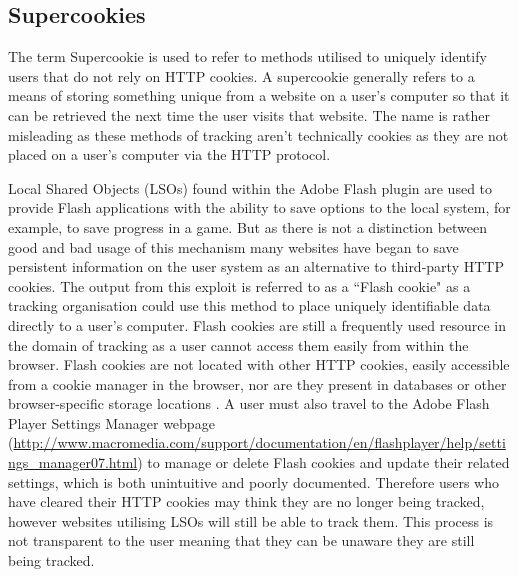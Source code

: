 \documentclass[12pt]{article}
\begin{document}
\subsection{Supercookies} \label{Supercookies}
The term Supercookie is used to refer to methods utilised to uniquely identify users that do not rely on HTTP cookies. A supercookie generally refers to a means of storing something unique from a website on a user's computer so that it can be retrieved the next time the user visits that website. The name is rather misleading as these methods of tracking aren't technically cookies as they are not placed on a user's computer via the HTTP protocol. \newline 

Local Shared Objects (LSOs) found within the Adobe Flash plugin are used to provide Flash applications with the ability to save options to the local system, for example, to save progress in a game. But as there is not a distinction between good and bad usage of this mechanism many websites have began to save persistent information on the user system as an alternative to third-party HTTP cookies. The output from this exploit is referred to as a ``Flash cookie" as a tracking organisation could use this method to place uniquely identifiable data directly to a user's computer. Flash cookies are still a frequently used resource in the domain of tracking as a user cannot access them easily from within the browser. Flash cookies are not located with other HTTP cookies, easily accessible from a cookie manager in the browser, nor are they present in databases or other browser-specific storage locations \parencite{flashCookies}. A user must also travel to the Adobe Flash Player Settings Manager webpage (\url{http://www.macromedia.com/support/documentation/en/flashplayer/help/settings_manager07.html}) to manage or delete Flash cookies and update their related settings, which is both unintuitive and poorly documented. Therefore users who have cleared their HTTP cookies may think they are no longer being tracked, however websites utilising LSOs will still be able to track them. This process is not transparent to the user meaning that they can be unaware they are still being tracked. \\ 
\end{document}
